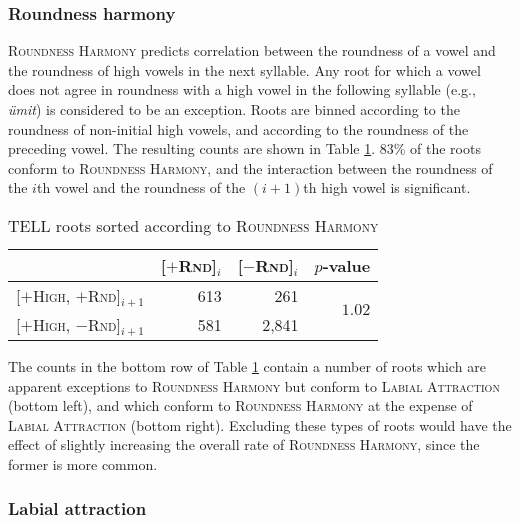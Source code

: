 \subsubsection{Roundness harmony}

\textsc{Roundness Harmony} predicts correlation between the roundness of a vowel and the roundness of high vowels in the next syllable. Any root for which a vowel does not agree in roundness with a high vowel in the following syllable (e.g., \emph{ümit}) is considered to be an exception. Roots are binned according to the roundness of non-initial high vowels, and according to the roundness of the preceding vowel. 
The resulting counts are shown in Table \ref{rhs}. 83\% of the roots conform to \textsc{Roundness Harmony}, and the interaction between the roundness of the $i$th vowel and the roundness of the $(i +1)$th high vowel is significant.

\begin{table}
\centering
\begin{tabular}{lrrr}
\toprule
                                              & [$+$\textsc{Rnd}]$_i$ & [$-$\textsc{Rnd}]$_i$ & $p$-value                      \\
\midrule
\buf{}[$+$\textsc{High}, $+$\textsc{Rnd}]$_{i+1}$ & 613                   &   261                 & \multirow{2}{*}{$1.02$\e{-36}} \\
\buf{}[$+$\textsc{High}, $-$\textsc{Rnd}]$_{i+1}$ & 581                   & 2,841                                                  \\
\bottomrule
\end{tabular}
\caption{TELL roots sorted according to \textsc{Roundness Harmony}}
\label{rhs}
\end{table}

\noindent
The counts in the bottom row of Table \ref{rhs} contain a number of roots which are apparent exceptions to \textsc{Roundness Harmony} but conform to \textsc{Labial Attraction} (bottom left), and which conform to \textsc{Roundness Harmony} at the expense of \textsc{Labial Attraction} (bottom right). Excluding these types of roots would have the effect of slightly increasing the overall rate of \textsc{Roundness Harmony}, since the former is more common.

\subsubsection{Labial attraction}


